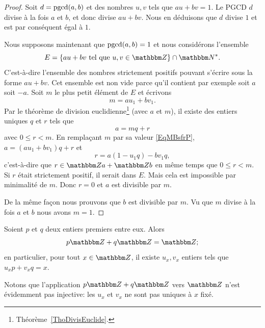 \begin{proof}
    Soit \( d=\operatorname{pgcd}(a,b)\) et des nombres \( u,v\) tels que \( au+bv=1\). Le PGCD \( d\) divise à la fois \( a\) et \( b\), et donc divise \( au+bv\). Nous en déduisons que \( d\) divise \( 1\) et est par conséquent égal à \( 1\).

    Nous supposons maintenant que \( \operatorname{pgcd}(a,b)=1\) et nous considérons l'ensemble
    \begin{equation}
        E=\{ au+bv\tq u,v\in \eZ \}\cap \eN^*.
    \end{equation}
    C'est-à-dire l'ensemble des nombres strictement positifs pouvant s'écrire sous la forme \( au+bv\). Cet ensemble est non vide parce qu'il contient par exemple soit \( a\) soit \( -a\). Soit \( m\) le plus petit élément de \( E\) et écrivons
    \begin{equation}    \label{EqMBsfrP}
        m=au_1+bv_1.
    \end{equation}
    Par le théorème de division euclidienne\footnote{Théorème~\ref{ThoDivisEuclide}.} (avec \( a\) et \( m\)), il existe des entiers uniques $q$ et $r$ tels que
    \begin{equation}
        a=mq+r
    \end{equation}
    avec \( 0\leq r<m\). En remplaçant \( m\) par sa valeur \eqref{EqMBsfrP}, \( a=(au_1+bv_1)q+r\) et
    \begin{equation}
        r=a(1-u_1q)-bv_1q,
    \end{equation}
    c'est-à-dire que \( r\in \eZ a+\eZ b\) en même temps que \( 0\leq r<m\). Si \( r\) était strictement positif, il serait dans \( E\). Mais cela est impossible par minimalité de \( m\). Donc \( r=0\) et \( a\) est divisible par \( m\).

    De la même façon nous prouvons que \( b\) est divisible par \( m\). Vu que \( m\) divise à la fois \( a\) et \( b\) nous avons \( m=1\).
\end{proof}

\begin{corollary}       \label{CorgEMtLj}
    Soient \( p\) et \( q\) deux entiers premiers entre eux. Alors
    \begin{equation}
        p\eZ+q\eZ=\eZ;
    \end{equation}
    en particulier, pour tout \( x \in \eZ \), il existe \( u_x, v_x \) entiers tels que \(u_x p + v_x q = x \).
\end{corollary}

Notons que l'application \( p\eZ+q\eZ\) vers \( \eZ\) n'est évidemment pas injective: les $u_x$ et $v_x$ ne sont pas uniques à $x$ fixé.

